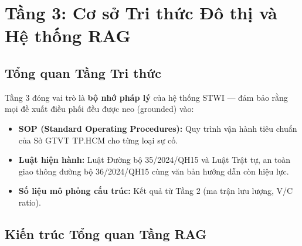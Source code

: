 \chapter{Tầng 3: Cơ sở Tri thức Đô thị và Hệ thống RAG}

\section{Tổng quan Tầng Tri thức}

Tầng 3 đóng vai trò là \textbf{bộ nhớ pháp lý} của hệ thống STWI --- đảm bảo rằng mọi đề xuất điều phối đều được neo (grounded) vào:
\begin{itemize}[itemsep=3pt]
  \item \textbf{SOP (Standard Operating Procedures):} Quy trình vận hành tiêu chuẩn của Sở GTVT TP.HCM cho từng loại sự cố.
  \item \textbf{Luật hiện hành:} Luật Đường bộ 35/2024/QH15 và Luật Trật tự, an toàn giao thông đường bộ 36/2024/QH15 cùng văn bản hướng dẫn còn hiệu lực.
  \item \textbf{Số liệu mô phỏng cấu trúc:} Kết quả từ Tầng 2 (ma trận lưu lượng, V/C ratio).
\end{itemize}

\section{Kiến trúc Tổng quan Tầng RAG}

